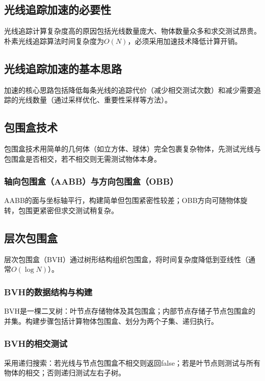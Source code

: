 \documentclass[12pt]{article}
\begin{document}
\subsection{光线追踪加速的必要性}

光线追踪计算复杂度高的原因包括光线数量庞大、物体数量众多和求交测试昂贵。朴素光线追踪算法时间复杂度为$O(N)$，必须采用加速技术降低计算开销。

\subsection{光线追踪加速的基本思路}

加速的核心思路包括降低每条光线的追踪代价（减少相交测试次数）和减少需要追踪的光线数量（通过采样优化、重要性采样等方法）。

\subsection{包围盒技术}

包围盒技术用简单的几何体（如立方体、球体）完全包裹复杂物体，先测试光线与包围盒是否相交，若不相交则无需测试物体本身。

\subsubsection{轴向包围盒（AABB）与方向包围盒（OBB）}
AABB的面与坐标轴平行，构建简单但包围紧密性较差；OBB方向可随物体旋转，包围更紧密但求交测试稍复杂。

\subsection{层次包围盒}

层次包围盒（BVH）通过树形结构组织包围盒，将时间复杂度降低到亚线性（通常$O(\log N)$）。

\subsubsection{BVH的数据结构与构建}
BVH是一棵二叉树：叶节点存储物体及其包围盒；内部节点存储子节点包围盒的并集。构建步骤包括计算物体包围盒、划分为两个子集、递归执行。

\subsubsection{BVH的相交测试}
采用递归搜索：若光线与节点包围盒不相交则返回false；若是叶节点则测试与所有物体的相交；否则递归测试左右子树。
\end{document}
